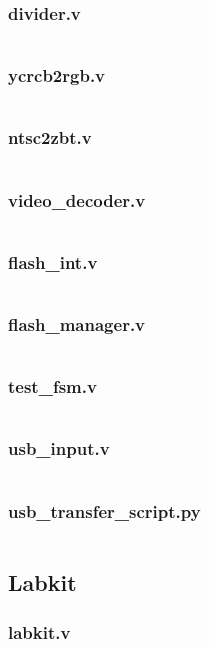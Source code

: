 \documentclass{article}
\begin{document}
\subsubsection{divider.v}
\inputminted[linenos]{verilog}{../../src/divider.v}
\subsubsection{ycrcb2rgb.v}
\inputminted[linenos]{verilog}{../../src/ycrcb2rgb.v}
\subsubsection{ntsc2zbt.v}
\inputminted[linenos]{verilog}{../../src/ntsc2zbt.v}
\subsubsection{video\_decoder.v}
\inputminted[linenos]{verilog}{../../src/video_decoder.v}
\subsubsection{flash\_int.v}
\inputminted[linenos]{verilog}{../../assets/flash_IO/flash_int.v}
\subsubsection{flash\_manager.v}
\inputminted[linenos]{verilog}{../../assets/flash_IO/flash_manager.v}
\subsubsection{test\_fsm.v}
\inputminted[linenos]{verilog}{../../assets/flash_IO/test_fsm.v}
\subsubsection{usb\_input.v}
\inputminted[linenos]{verilog}{../../assets/USB_Transfer/usb_input.v}
\subsubsection{usb\_transfer\_script.py}
\inputminted[linenos]{python}{../../assets/usb_transfer_script.py}


\subsection{Labkit}
\subsubsection{labkit.v}
\inputminted[linenos]{verilog}{../../src/labkit.v}
\end{document}
